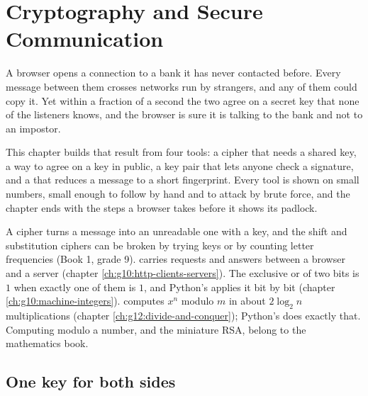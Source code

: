 \chapter{Cryptography and Secure Communication}\label{ch:g12:secure-communication}

A browser opens a connection to a bank it has never contacted before. Every message between them crosses networks
run by strangers, and any of them could copy it. Yet within a fraction of a second the two agree on a secret key
that none of the listeners knows, and the browser is sure it is talking to the bank and not to an impostor.

This chapter builds that result from four tools: a cipher that needs a shared key, a way to agree on a key in public,
a key pair that lets anyone check a signature, and a  that reduces a message to a short fingerprint.
Every tool is shown on small numbers, small enough to follow by hand and to attack by brute force, and the chapter
ends with the steps a browser takes before it shows its padlock.

\begin{recall}
A cipher turns a message into an unreadable one with a key, and the shift and substitution ciphers can be broken by
trying keys or by counting letter frequencies (Book 1, grade 9).  carries requests and answers between a browser
and a server (chapter \ref{ch:g10:http-clients-servers}). The exclusive or of two bits is $1$ when exactly one of
them is $1$, and Python's \code{^} applies it bit by bit (chapter \ref{ch:g10:machine-integers}). 
computes $x^n$ modulo $m$ in about $2 \log_2 n$ multiplications (chapter \ref{ch:g12:divide-and-conquer}); Python's
 does exactly that. Computing modulo a number, and the miniature RSA, belong to the mathematics
book.
\end{recall}

\section{One key for both sides}\label{sec:g12:secure-communication:symmetric}

